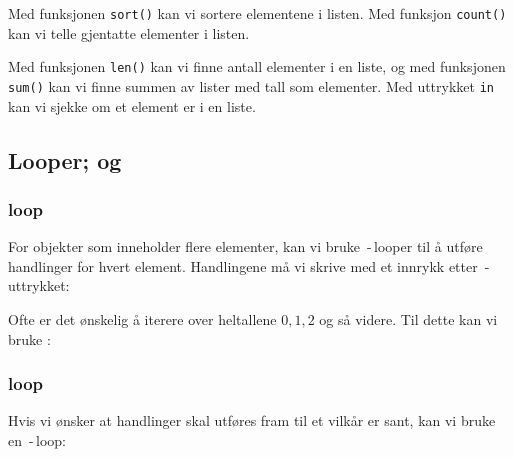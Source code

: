 Med funksjonen \texttt{sort()} kan vi sortere elementene i listen.
\vsk
\newpage
Med funksjon \texttt{count()} kan vi telle gjentatte elementer i listen.
 \vsk

Med funksjonen \texttt{len()} kan vi finne antall elementer i en liste, og med funksjonen \texttt{sum()} kan vi finne summen av lister med tall som elementer.
\newpage
Med uttrykket \texttt{in} kan vi sjekke om et element er i en liste.


\newpage
\subsection{Looper;  og }
\subsubsection{ loop}
For objekter som inneholder flere elementer, kan vi bruke \,-\,looper til å utføre handlinger for hvert element. Handlingene må vi skrive med et innrykk etter \,-\,uttrykket:
\vsk

Ofte er det ønskelig å iterere over heltallene $ 0, 1, 2 $ og så videre. Til dette kan vi bruke :
\subsubsection{ loop}
Hvis vi ønsker at handlinger skal utføres fram til et vilkår er sant, kan vi bruke en \,-\,loop: \regv
{}

